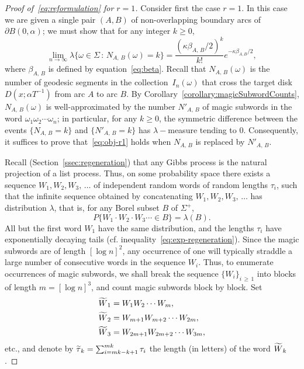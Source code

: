 \documentclass[AHL, Unicode, longabstracts, published]{cedram}
\let\oldtilde\tilde
\renewcommand*{\tilde}[1]{\mathchoice{\widetilde{#1}}{\widetilde{#1}}{\oldtilde{#1}}{\oldtilde{#1}}}\let\oldforall\forall
\renewcommand*{\forall}{\mathrel{\oldforall}}
\begin{document}
\begin{proof}[Proof of~\eqref{eq:reformulation} for $r= 1$]
Consider first the case $r=1$. In this case we are given a single pair $(A,B)$ of non-overlapping boundary arcs of $\partial B (0,\alpha)$; we must show that for any integer $k\geq 0$,
\begin{equation}\label{eq:obj-r1}
\lim_{n \rightarrow \infty} \lambda \{\omega \in \Sigma \,:\, N_{A,\,B} (\omega)=k\} = \frac{(\kappa \beta_{A,\,B}/2)^{k}}{k!} e^{- \kappa \beta_{A,B}/2},
\end{equation}
where $\beta_{A,\,B}$ is defined by equation~\eqref{eq:beta}. Recall that $N_{A,\,B} (\omega)$ is the number of geodesic segments in the collection~$I_{n} (\omega)$ that cross the target disk $D(x;\alpha T^{-1})$ from arc $A$ to arc $B$. By Corollary~\ref{corollary:magicSubwordCounts}, $N_{A,\,B} (\omega)$ is well-approximated by the number $N'_{A,\,B}$ of magic subwords in the word $\omega_{1}\omega_{2}\dotsb \omega_{n}$; in particular, for any $k\geq 0$, the symmetric difference between the events $\{N_{A,\,B}=k \}$ and $\{N'_{A,\,B} =k\}$ has $\lambda -$measure tending to $0$. Consequently, it suffices to prove that~\eqref{eq:obj-r1} holds when $N_{A,\,B}$ is replaced by $N'_{A,\,B}$.

Recall (Section~\ref{ssec:regeneration}) that any Gibbs process is the natural projection of a list process. Thus, on some probability space there exists a sequence $W_{1},W_{2},W_{3},\,\dotsc$ of independent random words of random lengths $\tau_{i}$, such that the infinite sequence obtained by concatenating $W_{1},W_{2},W_{3},\,\dotsc$ has distribution $\lambda$, that is, for any Borel subset $B$ of $\Sigma^{+}$,
\[
P\{W_{1}\cdot W_{2} \cdot W_{3} \dotsb \in B\}=\lambda (B).
\]
All but the first word $W_{1}$ have the same distribution, and the lengths $\tau_{i}$ have exponentially decaying tails (cf. inequality~\eqref{eq:exp-regeneration}). Since the magic subwords are of length $[\log n]^{2}$, any occurrence of one will typically straddle a large number of consecutive words in the sequence $W_{i}$. Thus, to enumerate occurrences of magic subwords, we shall break the sequence $\{W_{i} \}_{i\,\geq\,1}$ into blocks of length $m=[\log n]^{3}$, and count magic subwords block by block. Set
\begin{align*}
\tilde{W}_{1}&=W_{1}W_{2}\dotsb W_{m},\\
\tilde{W}_{2}&=W_{m+1}W_{m+2}\dotsb W_{2m},\\
\tilde{W}_{3}&=W_{2m+1}W_{2m+2}\dotsb W_{3m},
\end{align*}
etc., and denote by $\tilde{\tau}_{k}=\sum_{i=mk-k+1}^{mk}\tau_{i}$ the length (in letters) of the word $\tilde{W}_{k}$.


\end{proof}
\end{document}
